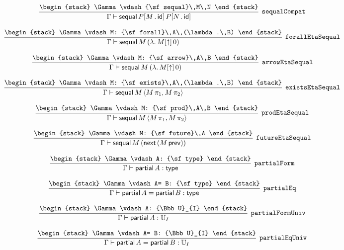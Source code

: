 \[
\infer[{\tt sequalCompat}]{\Gamma \vdash {\sf sequal}\,P[M\,.\,{\sf id}]\,P[N\,.\,{\sf id}]}{
\begin{stack}
\Gamma \vdash {\sf sequal}\,M\,N
\end{stack}}
\]

\[
\infer[{\tt forallEtaSequal}]{\Gamma \vdash {\sf sequal}\,M\,(\lambda .\,M[\uparrow ]\,0)}{
\begin{stack}
\Gamma \vdash M: {\sf forall}\,A\,(\lambda .\,B)
\end{stack}}
\]

\[
\infer[{\tt arrowEtaSequal}]{\Gamma \vdash {\sf sequal}\,M\,(\lambda .\,M[\uparrow ]\,0)}{
\begin{stack}
\Gamma \vdash M: {\sf arrow}\,A\,B
\end{stack}}
\]

\[
\infer[{\tt existsEtaSequal}]{\Gamma \vdash {\sf sequal}\,M\,\langle M\, \pi_1,M\, \pi_2\rangle }{
\begin{stack}
\Gamma \vdash M: {\sf exists}\,A\,(\lambda .\,B)
\end{stack}}
\]

\[
\infer[{\tt prodEtaSequal}]{\Gamma \vdash {\sf sequal}\,M\,\langle M\, \pi_1,M\, \pi_2\rangle }{
\begin{stack}
\Gamma \vdash M: {\sf prod}\,A\,B
\end{stack}}
\]

\[
\infer[{\tt futureEtaSequal}]{\Gamma \vdash {\sf sequal}\,M\,({\sf next}\,(M\, {\sf prev}))}{
\begin{stack}
\Gamma \vdash M: {\sf future}\,A
\end{stack}}
\]

\[
\infer[{\tt partialForm}]{\Gamma \vdash {\sf partial}\,A: {\sf type}}{
\begin{stack}
\Gamma \vdash A: {\sf type}
\end{stack}}
\]

\[
\infer[{\tt partialEq}]{\Gamma \vdash {\sf partial}\,A= {\sf partial}\,B: {\sf type}}{
\begin{stack}
\Gamma \vdash A= B: {\sf type}
\end{stack}}
\]

\[
\infer[{\tt partialFormUniv}]{\Gamma \vdash {\sf partial}\,A: {\Bbb U}_{I}}{
\begin{stack}
\Gamma \vdash A: {\Bbb U}_{I}
\end{stack}}
\]

\[
\infer[{\tt partialEqUniv}]{\Gamma \vdash {\sf partial}\,A= {\sf partial}\,B: {\Bbb U}_{I}}{
\begin{stack}
\Gamma \vdash A= B: {\Bbb U}_{I}
\end{stack}}
\]

